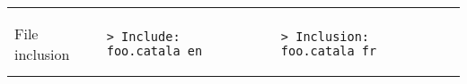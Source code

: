 \documentclass[a3paper,landscape]{article}
\begin{document}
\begin{multicols*}{2}
\begin{center}
\begin{tabular}{p{}p{}p{}}
      \vspace*{-1.75em}
      \\
      File inclusion &
      \vspace*{-1.75em}
      \begin{verbatim}
> Include: foo.catala_en
\end{verbatim}
      \vspace*{-1.75em}
                     &
      \vspace*{-1.75em}
      \begin{verbatim}
> Inclusion: foo.catala_fr
\end{verbatim}
      \vspace*{-1.75em}
      \\
      \bottomrule
    \end{tabular}
  \end{center}
  \newcommand*\FancyVerbStartString{```catala}
  \newcommand*\FancyVerbStopString{```}















\end{multicols*}
\end{document}
